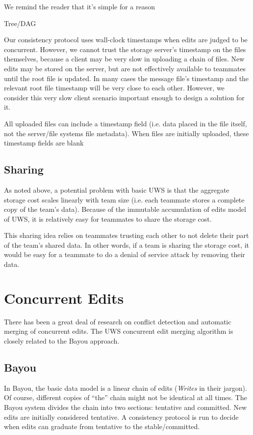 \documentclass{article}
\begin{document}
We remind the reader that it's simple for a reason

Tree/DAG

Our consistency protocol uses wall-clock timestamps when edits are judged to be concurrent.
However, we cannot trust the storage server's timestamp on the files themselves, because a client may be very slow in uploading a chain of files.
New edits may be stored on the server, but are not effectively available to teammates until the root file is updated.
In many cases the message file's timestamp and the relevant root file timestamp will be very close to each other.
However, we consider this very slow client scenario important enough to design a solution for it.

All uploaded files can include a timestamp field (i.e. data placed in the file itself, not the server/file systems file metadata).
When files are initially uploaded, these timestamp fields are blank



\subsection{Sharing}

As noted above, a potential problem with basic UWS is that the aggregate storage cost scales linearly with team size (i.e. each teammate stores a complete copy of the team's data).
Because of the immutable accumulation of edits model of UWS, it is relatively easy for teammates to share the storage cost.

This sharing idea relies on teammates trusting each other to not delete their part of the team's shared data.
In other words, if a team is sharing the storage cost, it would be easy for a teammate to do a denial of service attack by removing their data.

\section{Concurrent Edits}

There has been a great deal of research on conflict detection and automatic merging of concurrent edits.
The UWS concurrent edit merging algorithm is closely related to the Bayou approach.

\subsection{Bayou}

In Bayou, the basic data model is a linear chain of edits (\emph{Writes} in their jargon).
Of course, different copies of ``the'' chain might not be identical at all times.
The Bayou system divides the chain into two sections: tentative and committed.
New edits are initially considered tentative.
A consistency protocol is run to decide when edits can graduate from tentative to the stable{\slash}committed.
\end{document}
